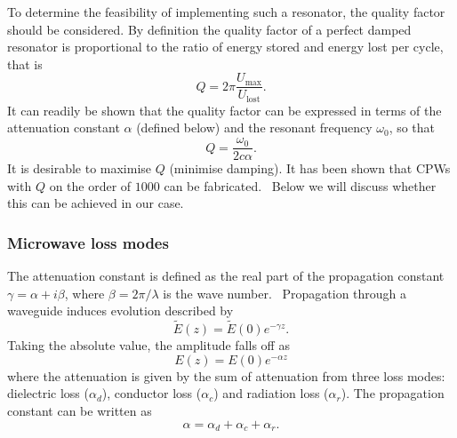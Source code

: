 To determine the feasibility of implementing such a resonator, the quality
factor should be considered. By definition the quality factor of a perfect
damped resonator is proportional to the ratio of energy stored and energy lost
per cycle, that is~\cite{Pain1999}
\begin{equation}
  Q = 2\pi\frac{U_\mathrm{max}}{U_\mathrm{lost}}.
  \label{experiment:mw:eqn:Qdef}
\end{equation}
It can readily be shown that the quality factor can be expressed in terms of the
attenuation constant $\alpha$ (defined below) and the resonant frequency
$\omega_0$, so that~\cite{Simons2004}
%
\begin{equation}
  Q = \frac{\omega_0}{2c\alpha}.
  \label{experiment:mw:eqn:Qalpha}
\end{equation}
%
It is desirable to maximise $Q$ (minimise damping). It has been shown that CPWs
with $Q$ on the order of $1000$ can be fabricated.~\cite{doi:10.1063/1.3010859,
Hattermann2017} Below we will discuss whether this can be achieved in our case.

\subsubsection{Microwave loss modes}


The attenuation constant is defined as the real part of the propagation
constant $\gamma = \alpha + i\beta$, where $\beta = 2\pi / \lambda$ is the wave
number.~\cite{Simons2004} Propagation through a waveguide induces evolution
described by
%
\begin{equation}
  \widetilde{E}(z) = \widetilde{E}(0)e^{-\gamma z}.
  \label{experiment:mw:eqn:Eloss}
\end{equation}
%
Taking the absolute value, the amplitude falls off as
%
\begin{equation}
  E(z) = E(0)e^{-\alpha z}
\end{equation}
%
where the attenuation is given by the sum of attenuation from three loss modes:
dielectric loss ($\alpha_d$), conductor loss ($\alpha_c$) and radiation loss
($\alpha_r$). The propagation constant can be written as
%
\begin{equation}
  \alpha = \alpha_d + \alpha_c + \alpha_r.
\end{equation}

